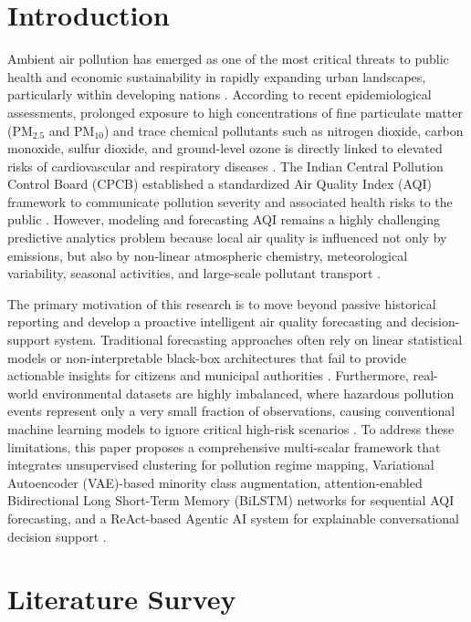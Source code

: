 \documentclass[conference]{IEEEtran}
\begin{document}
\section{Introduction}

Ambient air pollution has emerged as one of the most critical threats to public health and economic sustainability in rapidly expanding urban landscapes, particularly within developing nations \cite{guttikunda,cpcb}. According to recent epidemiological assessments, prolonged exposure to high concentrations of fine particulate matter ($\text{PM}_{2.5}$ and $\text{PM}_{10}$) and trace chemical pollutants such as nitrogen dioxide, carbon monoxide, sulfur dioxide, and ground-level ozone is directly linked to elevated risks of cardiovascular and respiratory diseases \cite{guttikunda}. The Indian Central Pollution Control Board (CPCB) established a standardized Air Quality Index (AQI) framework to communicate pollution severity and associated health risks to the public \cite{cpcb}. However, modeling and forecasting AQI remains a highly challenging predictive analytics problem because local air quality is influenced not only by emissions, but also by non-linear atmospheric chemistry, meteorological variability, seasonal activities, and large-scale pollutant transport \cite{zhang,kumar}.

The primary motivation of this research is to move beyond passive historical reporting and develop a proactive intelligent air quality forecasting and decision-support system. Traditional forecasting approaches often rely on linear statistical models or non-interpretable black-box architectures that fail to provide actionable insights for citizens and municipal authorities \cite{patel,sharma}. Furthermore, real-world environmental datasets are highly imbalanced, where hazardous pollution events represent only a very small fraction of observations, causing conventional machine learning models to ignore critical high-risk scenarios \cite{kingma,goodfellow}. To address these limitations, this paper proposes a comprehensive multi-scalar framework that integrates unsupervised clustering for pollution regime mapping, Variational Autoencoder (VAE)-based minority class augmentation, attention-enabled Bidirectional Long Short-Term Memory (BiLSTM) networks for sequential AQI forecasting, and a ReAct-based Agentic AI system for explainable conversational decision support \cite{singh,rao,li,kingma,yao}.

\section{Literature Survey}
\end{document}
